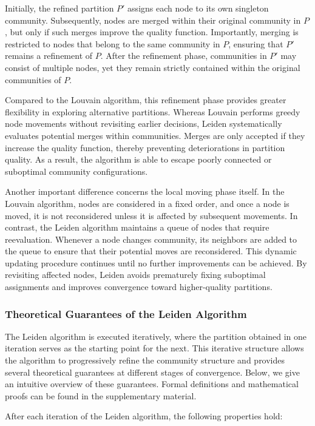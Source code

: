Initially, the refined partition $P'$ assigns each node to its own singleton 
community. Subsequently, nodes are merged within their original community in $P$, 
but only if such merges improve the quality function. Importantly, merging is 
restricted to nodes that belong to the same community in $P$, ensuring that $P'$ 
remains a refinement of $P$. After the refinement phase, communities in $P'$ 
may consist of multiple nodes, yet they remain strictly contained within the 
original communities of $P$.

Compared to the Louvain algorithm, this refinement phase provides greater 
flexibility in exploring alternative partitions. Whereas Louvain performs 
greedy node movements without revisiting earlier decisions, Leiden systematically 
evaluates potential merges within communities. Merges are only accepted if they 
increase the quality function, thereby preventing deteriorations in partition quality. 
As a result, the algorithm is able to escape poorly connected or suboptimal 
community configurations.

Another important difference concerns the local moving phase itself. 
In the Louvain algorithm, nodes are considered in a fixed order, and once 
a node is moved, it is not reconsidered unless it is affected by subsequent 
movements. In contrast, the Leiden algorithm maintains a queue of nodes that 
require reevaluation. Whenever a node changes community, its neighbors are 
added to the queue to ensure that their potential moves are reconsidered. 
This dynamic updating procedure continues until no further improvements can 
be achieved. By revisiting affected nodes, Leiden avoids prematurely fixing 
suboptimal assignments and improves convergence toward higher-quality partitions.

\subsubsection{Theoretical Guarantees of the Leiden Algorithm}

The Leiden algorithm is executed iteratively, where the partition obtained 
in one iteration serves as the starting point for the next. This iterative 
structure allows the algorithm to progressively refine the community 
structure and provides several theoretical guarantees at different stages 
of convergence. Below, we give an intuitive overview of these guarantees. 
Formal definitions and mathematical proofs can be found in the supplementary material.

After each iteration of the Leiden algorithm, the following properties hold:

